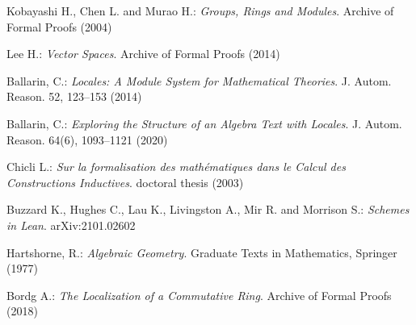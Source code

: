 \documentclass[12pt]{scrartcl}
\begin{document}
\begin{thebibliography}{}
	
	Kobayashi H., Chen L. and Murao H.:
	\newblock \textit{Groups, Rings and Modules}.
	\newblock Archive of Formal Proofs (2004)
	
	Lee H.:
	\newblock \textit{Vector Spaces}.
	\newblock Archive of Formal Proofs (2014)
	
	Ballarin, C.: 
	\newblock \textit{Locales: A Module System for Mathematical Theories}.
	\newblock J. Autom. Reason. 52, 123–153 (2014)
	
	Ballarin, C.:
	\newblock \textit{Exploring the Structure of an Algebra Text with Locales}. 
	\newblock J. Autom. Reason. 64(6), 1093–1121 (2020)
	
	Chicli L.:
	\newblock \textit{Sur la formalisation des math\'ematiques dans le Calcul des Constructions Inductives}.
	\newblock doctoral thesis (2003)
	
	Buzzard K., Hughes C., Lau K., Livingston A., Mir R. and Morrison S.:
	\newblock \textit{Schemes in Lean}.
	\newblock arXiv:2101.02602
	
	Hartshorne, R.:
	\newblock \textit{Algebraic Geometry}.
	\newblock Graduate Texts in Mathematics, Springer (1977)
	
	Bordg A.:
	\newblock \textit{The Localization of a Commutative Ring}.
	\newblock Archive of Formal Proofs (2018)
	
\end{thebibliography}

					

		
\end{document}
